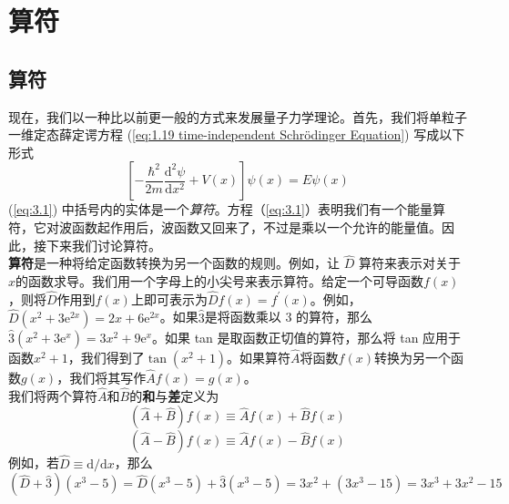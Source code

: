 \chapter{算符}
\section{算符}
	现在，我们以一种比以前更一般的方式来发展量子力学理论。首先，我们将单粒子一维定态薛定谔方程 (\ref{eq:1.19 time-independent Schrödinger Equation}) 写成以下形式
	\begin{equation}
		\left[-\frac{\hbar^2}{2m}\frac{\mathrm{d}^2\psi}{\mathrm{d}x^2}+V\left(x\right)\right]\psi\left(x\right) = E\psi\left(x\right)
		\label{eq:3.1}
	\end{equation}
	(\ref{eq:3.1}) 中括号内的实体是一个\textit{算符}。方程（\ref{eq:3.1}）表明我们有一个能量算符，它对波函数起作用后，波函数又回来了，不过是乘以一个允许的能量值。因此，接下来我们讨论算符。\\
	\indent \textbf{算符}是一种将给定函数转换为另一个函数的规则。例如，让 $\hat{D}$ 算符来表示对关于$x$的函数求导。我们用一个字母上的小尖号来表示算符。给定一个可导函数$f\left(x\right)$，则将$\hat{D}$作用到$f\left(x\right)$上即可表示为$\hat{D}f\left(x\right) = f^{\prime}\left(x\right)$。例如，$\hat{D}\left(x^2+3\mathrm{e}^{2x}\right) = 2x+6\mathrm{e}^{2x}$。如果$\hat{3}$是将函数乘以 3 的算符，那么$\hat{3}\left(x^2+3\mathrm{e}^x\right) = 3x^2+9\mathrm{e}^x$。如果 tan 是取函数正切值的算符，那么将 tan 应用于函数$x^2+1$，我们得到了$\tan\left(x^2+1\right)$。如果算符$\hat{A}$将函数$f\left(x\right)$转换为另一个函数$g\left(x\right)$，我们将其写作$\hat{A}f\left(x\right) = g\left(x\right)$。\\
	\indent 我们将两个算符$\hat{A}$和$\hat{B}$的\textbf{和}与\textbf{差}定义为
	\begin{equation}
		\boxed{
			\left(\hat{A}+\hat{B}\right)f\left(x\right) \equiv \hat{A}f\left(x\right)+\hat{B}f\left(x\right)
		}
		\label{eq:3.2 definition of operators' sum and differenct}
	\end{equation}
	\begin{equation*}
		\left(\hat{A}-\hat{B}\right)f\left(x\right) \equiv \hat{A}f\left(x\right)-\hat{B}f\left(x\right)
	\end{equation*}
	例如，若$\hat{D} \equiv \mathrm{d}/\mathrm{d}x$，那么
	\begin{equation*}
		\left(\hat{D}+\hat{3}\right)\left(x^3-5\right) = \hat{D}\left(x^3-5\right)+ \hat{3}\left(x^3-5\right) = 3x^2+\left(3x^3-15\right) = 3x^3+3x^2-15
	\end{equation*}
